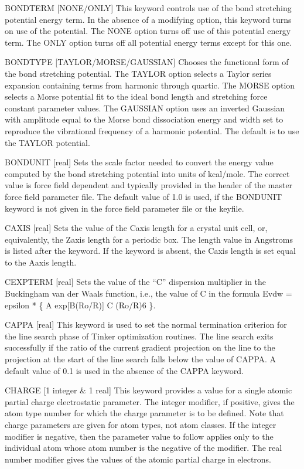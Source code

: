 \documentclass[letterpaper,11pt,english]{sphinxmanual}
\begin{document}
BONDTERM {[}NONE/ONLY{]}     This keyword controls use of the bond stretching potential energy term. In the absence of a modifying option, this keyword turns on use of the potential. The NONE option turns off use of this potential energy term. The ONLY option turns off all potential energy terms except for this one.

BONDTYPE {[}TAYLOR/MORSE/GAUSSIAN{]}     Chooses the functional form of the bond stretching potential. The TAYLOR option selects a Taylor series expansion containing terms from harmonic through quartic. The MORSE option selects a Morse potential fit to the ideal bond length and stretching force constant parameter values. The GAUSSIAN option uses an inverted Gaussian with amplitude equal to the Morse bond dissociation energy and width set to reproduce the vibrational frequency of a harmonic potential. The default is to use the TAYLOR potential.

BONDUNIT {[}real{]}     Sets the scale factor needed to convert the energy value computed by the bond stretching potential into units of kcal/mole. The correct value is force field dependent and typically provided in the header of the master force field parameter file. The default value of 1.0 is used, if the BONDUNIT keyword is not given in the force field parameter file or the keyfile.

C\sphinxhyphen{}AXIS {[}real{]}     Sets the value of the C\sphinxhyphen{}axis length for a crystal unit cell, or, equivalently, the Z\sphinxhyphen{}axis length for a periodic box. The length value in Angstroms is listed after the keyword. If the keyword is absent, the C\sphinxhyphen{}axis length is set equal to the A\sphinxhyphen{}axis length.

C\sphinxhyphen{}EXPTERM {[}real{]}     Sets the value of the “C” dispersion multiplier in the Buckingham van der Waals function, i.e., the value of C in the formula Evdw = epsilon * \{ A exp{[}\sphinxhyphen{}B(Ro/R){]} \sphinxhyphen{} C (Ro/R)6 \}.

CAPPA {[}real{]}     This keyword is used to set the normal termination criterion for the line search phase of Tinker optimization routines. The line search exits successfully if the ratio of the current gradient projection on the line to the projection at the start of the line search falls below the value of CAPPA. A default value of 0.1 is used in the absence of the CAPPA keyword.

CHARGE {[}1 integer \& 1 real{]}     This keyword provides a value for a single atomic partial charge electrostatic parameter. The integer modifier, if positive, gives the atom type number for which the charge parameter is to be defined. Note that charge parameters are given for atom types, not atom classes. If the integer modifier is negative, then the parameter value to follow applies only to the individual atom whose atom number is the negative of the modifier. The real number modifier gives the values of the atomic partial charge in electrons.
\end{document}
